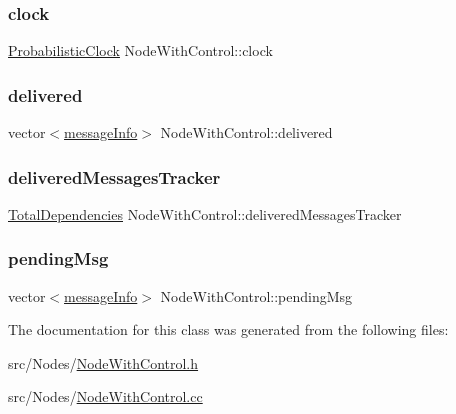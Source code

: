 \subsubsection{\texorpdfstring{clock}{clock}}
{\footnotesize\ttfamily \hyperlink{classProbabilisticClock}{Probabilistic\+Clock} Node\+With\+Control\+::clock\hspace{0.3cm}{\ttfamily [protected]}}

\mbox{\label{classNodeWithControl_aed34cc5a5b277c43f10f8cbbbeb59327}} 
\subsubsection{\texorpdfstring{delivered}{delivered}}
{\footnotesize\ttfamily vector$<$\hyperlink{structures_8h_a7e7bdc1d2fff8a9436f2f352b2711ed6}{message\+Info}$>$ Node\+With\+Control\+::delivered\hspace{0.3cm}{\ttfamily [protected]}}

\mbox{\label{classNodeWithControl_a6c868fa52cca68f650dca96a788475df}} 
\subsubsection{\texorpdfstring{delivered\+Messages\+Tracker}{deliveredMessagesTracker}}
{\footnotesize\ttfamily \hyperlink{classTotalDependencies}{Total\+Dependencies} Node\+With\+Control\+::delivered\+Messages\+Tracker\hspace{0.3cm}{\ttfamily [protected]}}

\mbox{\label{classNodeWithControl_af38ffbedc82038536c77314f22ea6b57}} 
\subsubsection{\texorpdfstring{pending\+Msg}{pendingMsg}}
{\footnotesize\ttfamily vector$<$\hyperlink{structures_8h_a7e7bdc1d2fff8a9436f2f352b2711ed6}{message\+Info}$>$ Node\+With\+Control\+::pending\+Msg\hspace{0.3cm}{\ttfamily [protected]}}



The documentation for this class was generated from the following files\+:\begin{DoxyCompactItemize}
\item 
src/\+Nodes/\hyperlink{NodeWithControl_8h}{Node\+With\+Control.\+h}\item 
src/\+Nodes/\hyperlink{NodeWithControl_8cc}{Node\+With\+Control.\+cc}\end{DoxyCompactItemize}
